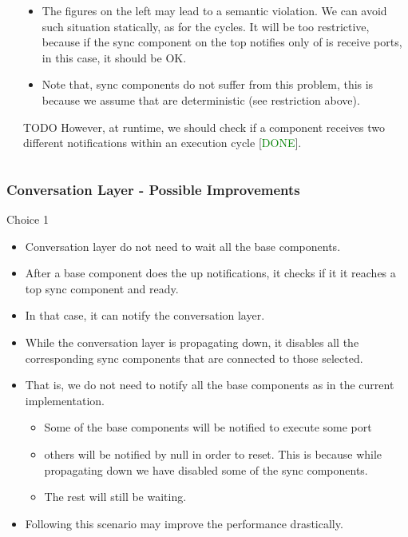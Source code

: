 \documentclass[compress,xcolor=dvipsnames,10pt]{beamer}
\begin{document}
\begin{frame}
\begin{columns}
\begin{column}{0.4\textwidth}
\end{column}
\begin{column}{0.6\textwidth}
\begin{itemize}
\item The figures on the left may lead to a semantic violation. We can avoid such situation statically, as for the cycles. It will be too restrictive, because if the sync component on the top notifies only of is receive ports, in this case, it should be OK. 
\item Note that, sync components do not suffer from this problem, this is because we assume that are deterministic (see restriction above). 
\end{itemize}

\begin{block}{TODO}
However, at runtime, we should check if a component receives two different notifications within an execution cycle [\textcolor{green}{DONE}]. 
\end{block}
\end{column}
\end{columns}
\end{frame}


\begin{frame}
\frametitle{Conversation Layer - Possible Improvements}
\begin{block}{Choice 1}
\begin{itemize}
\item Conversation layer do not need to wait all the base components. 
\item After a base component does the up notifications, it checks if it it reaches a top sync component and ready. 
\item In that case, it can notify the conversation layer. 
\item While the conversation layer is propagating down, it disables all the corresponding sync components that are connected to those selected. 
\item That is, we do not need to notify all the base components as in the current implementation. 
\begin{itemize}
\item Some of the base components will be notified to execute some port
\item others will be notified by null in order to reset. This is because while propagating down we have disabled some of the sync components. 
\item The rest will still be waiting.  
\end{itemize}
\item Following this scenario may improve the performance drastically. 
\end{itemize}
\end{block}
\end{frame}
\end{document}
